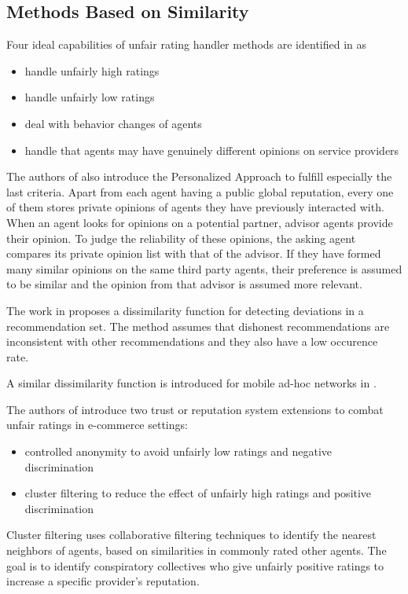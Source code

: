 \documentclass[%
    ]{\PathToTumTemplate/thesis/tum_thesis}
\begin{document}


\subsection{Methods Based on Similarity}

Four ideal capabilities of unfair rating handler methods are identified in \cite{zhang_personalized_2006} as
\begin{itemize}
\item handle unfairly high ratings
\item handle unfairly low ratings
\item deal with behavior changes of agents
\item handle that agents may have genuinely different opinions on service providers
\end{itemize}
The authors of \cite{zhang_personalized_2006} also introduce the Personalized Approach to fulfill especially the last criteria.
Apart from each agent having a public global reputation, every one of them stores private opinions of agents they have previously interacted with.
When an agent looks for opinions on a potential partner, advisor agents provide their opinion.
To judge the reliability of these opinions, the asking agent compares its private opinion list with that of the advisor.
If they have formed many similar opinions on the same third party agents, their preference is assumed to be similar and the opinion from that advisor is assumed more relevant.

The work in \cite{iltaf_mechanism_2013} proposes a dissimilarity function for detecting deviations in a recommendation set.
The method assumes that dishonest recommendations are inconsistent with other recommendations and they also have a low occurence rate.

A similar dissimilarity function is introduced for mobile ad-hoc networks in \cite{zakirullah_detection_2014}.

The authors of \cite{dellarocas_immunizing_2000} introduce two trust or reputation system extensions to combat unfair ratings in e-commerce settings:
\begin{itemize}
\item controlled anonymity to avoid unfairly low ratings and negative discrimination
\item cluster filtering to reduce the effect of unfairly high ratings and positive discrimination
\end{itemize}
Cluster filtering uses collaborative filtering techniques to identify the nearest neighbors of agents, based on similarities in commonly rated other agents.
The goal is to identify conspiratory collectives who give unfairly positive ratings to increase a specific provider's reputation.
\end{document}
